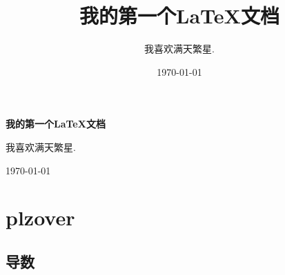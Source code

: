 \documentclass[12pt, a4paper, oneside]{ctexart}
\title{\Huge\bfseries 我的第一个\LaTeX 文档}
\author{\Large 我喜欢满天繁星.}
\date{\Large \today}
\begin{document}
\begin{titlepage}
    \centering
    \vspace*{5cm}
    {\Huge\bfseries 我的第一个\LaTeX 文档\par}
    \vspace{1.5cm}
    {\Large 我喜欢满天繁星.\par}
    \vfill
    {\large \today\par}
\end{titlepage}

\thispagestyle{empty}

\newpage

\thispagestyle{empty}

\tableofcontents

\newpage

\setcounter{page}{1}

\section{plzover}

\subsection{导数}
\end{document}

